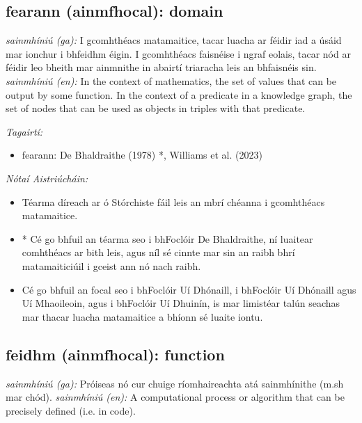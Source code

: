 \documentclass{article}
\begin{document}
\subsection*{fearann (ainmfhocal): domain} 
 \noindent \textit{sainmhíniú (ga):} I gcomhthéacs matamaitice, tacar luacha ar féidir iad a úsáid mar ionchur i bhfeidhm éigin. I gcomhthéacs faisnéise i ngraf eolais, tacar nód ar féidir leo bheith mar ainmnithe in abairtí triaracha leis an bhfaisnéis sin.
\newline\newline
 \noindent \textit{sainmhíniú (en):} In the context of mathematics, the set of values that can be output by some function. In the context of a predicate in a knowledge graph, the set of nodes that can be used as objects in triples with that predicate.
\newline

 \noindent \textit{Tagairtí:}
\begin{itemize}
	\item fearann: De Bhaldraithe (1978) \cite{de-bhaldraithe}*, Williams et al. (2023) \cite{storchiste}
\end{itemize}

 \noindent \textit{Nótaí Aistriúcháin:}
\begin{itemize}
	\item Téarma díreach ar ó Stórchiste fáil leis an mbrí chéanna i gcomhthéacs matamaitice.
	\item * Cé go bhfuil an téarma seo i bhFoclóir De Bhaldraithe, ní luaitear comhthéacs ar bith leis, agus níl sé cinnte mar sin an raibh bhrí matamaiticiúil i gceist ann nó nach raibh.
	\item Cé go bhfuil an focal seo i bhFoclóir Uí Dhónaill, i bhFoclóir Uí Dhónaill agus Uí Mhaoileoin, agus i bhFoclóir Uí Dhuinín, is mar limistéar talún seachas mar thacar luacha matamaitice a bhíonn sé luaite iontu.
\end{itemize}


\subsection*{feidhm (ainmfhocal): function} 
 \noindent \textit{sainmhíniú (ga):} Próiseas nó cur chuige ríomhaireachta atá sainmhínithe (m.sh mar chód).
\newline\newline
 \noindent \textit{sainmhíniú (en):} A computational process or algorithm that can be precisely defined (i.e. in code).
\newline
\end{document}
